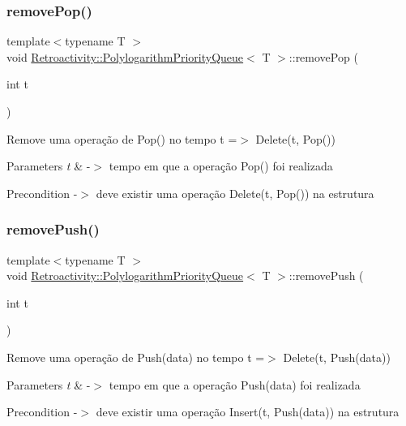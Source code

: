 \subsubsection{\texorpdfstring{remove\+Pop()}{removePop()}}
{\footnotesize\ttfamily template$<$typename T $>$ \\
void \hyperlink{classRetroactivity_1_1PolylogarithmPriorityQueue}{Retroactivity\+::\+Polylogarithm\+Priority\+Queue}$<$ T $>$\+::remove\+Pop (\begin{DoxyParamCaption}\item[{int}]{t }\end{DoxyParamCaption})}

Remove uma operação de Pop() no tempo t =$>$ Delete(t, Pop())


\begin{DoxyParams}{Parameters}
{\em t} & -\/$>$ tempo em que a operação Pop() foi realizada \\
\hline
\end{DoxyParams}
\begin{DoxyPrecond}{Precondition}
-\/$>$ deve existir uma operação Delete(t, Pop()) na estrutura 
\end{DoxyPrecond}
\mbox{\label{classRetroactivity_1_1PolylogarithmPriorityQueue_ad19cb99726304b5b47213f28e23d24fc}} 
\subsubsection{\texorpdfstring{remove\+Push()}{removePush()}}
{\footnotesize\ttfamily template$<$typename T $>$ \\
void \hyperlink{classRetroactivity_1_1PolylogarithmPriorityQueue}{Retroactivity\+::\+Polylogarithm\+Priority\+Queue}$<$ T $>$\+::remove\+Push (\begin{DoxyParamCaption}\item[{int}]{t }\end{DoxyParamCaption})}

Remove uma operação de Push(data) no tempo t =$>$ Delete(t, Push(data))


\begin{DoxyParams}{Parameters}
{\em t} & -\/$>$ tempo em que a operação Push(data) foi realizada \\
\hline
\end{DoxyParams}
\begin{DoxyPrecond}{Precondition}
-\/$>$ deve existir uma operação Insert(t, Push(data)) na estrutura 
\end{DoxyPrecond}


